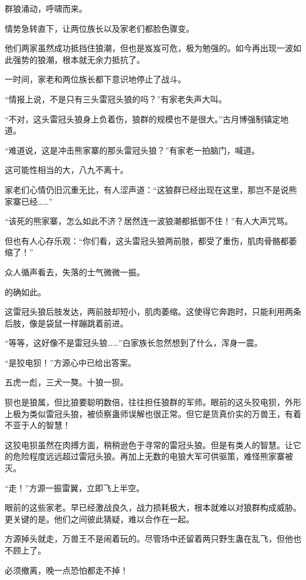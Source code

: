 
\begin{this_body}

群狼涌动，呼啸而来。

情势急转直下，让两位族长以及家老们都脸色骤变。

他们两家虽然成功抵挡住狼潮，但也是岌岌可危，极为勉强的。如今再出现一波如此强势的狼潮，根本就无余力抵抗了。

一时间，家老和两位族长都下意识地停止了战斗。

“情报上说，不是只有三头雷冠头狼的吗？”有家老失声大叫。

“不对，这头雷冠头狼身上负着伤，狼群的规模也不是很大。”古月博强制镇定地道。

“难道说，这是冲击熊家寨的那头雷冠头狼？”有家老一拍脑门，喊道。

这可能性相当的大，八九不离十。

家老们心情仍旧沉重无比，有人涩声道：“这狼群已经出现在这里，那岂不是说熊家寨已经……”

“该死的熊家寨，怎么如此不济？居然连一波狼潮都抵御不住！”有人大声咒骂。

但也有人心存乐观：“你们看，这头雷冠头狼两前肢，都受了重伤，肌肉骨骼都萎缩了！”

众人循声看去，失落的士气微微一振。

的确如此。

这雷冠头狼后肢发达，两前肢却短小，肌肉萎缩。这使得它奔跑时，只能利用两条后肢，像是袋鼠一样蹦跳着前进。

“等等，这好像不是雷冠头狼……”白家族长忽然想到了什么，浑身一震。

“是狡电狈！”方源心中已给出答案。

五虎一彪，三犬一獒。十狼一狈。

狈也是狼属，但比狼要聪明数倍，往往担任狼群的军师。眼前的这头狡电狈，外形上极为类似雷冠头狼，被侦察蛊师误解也很正常。但它是货真价实的万兽王，有着不亚于人的智慧！

这狡电狈虽然在肉搏方面，稍稍逊色于寻常的雷冠头狼。但是有类人的智慧。让它的危险程度远远超过雷冠头狼。再加上无数的电狼大军可供驱策，难怪熊家寨被灭。

“走！”方源一振雷翼，立即飞上半空。

眼前的这些家老。早已经激战良久，战力损耗极大，根本就难以对狼群构成威胁。更关键的是。他们之间彼此猜疑，难以合作在一起。

方源掉头就走，万兽王不是闹着玩的。尽管场中还留着两只野生蛊在乱飞，但他也不顾上了。

必须撤离，晚一点恐怕都走不掉！


\end{this_body}
